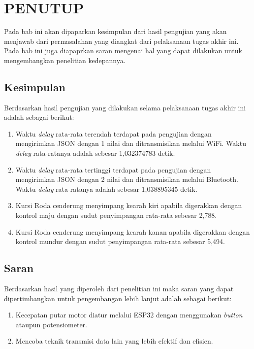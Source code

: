 \chapter{PENUTUP}
\label{chap:penutup}

Pada bab ini akan dipaparkan kesimpulan dari hasil pengujian yang akan menjawab dari permasalahan yang diangkat dari pelaksanaan tugas akhir ini. Pada bab ini juga diapaprkan saran mengenai hal yang dapat dilakukan untuk mengembangkan penelitian kedepannya.


\section{Kesimpulan}
\label{sec:kesimpulan}

Berdasarkan hasil pengujian yang dilakukan selama pelaksanaan tugas akhir ini adalah sebagai berikut:

\begin{enumerate}[nolistsep]

  \item Waktu \emph{delay} rata-rata terendah terdapat pada pengujian dengan mengirimkan JSON dengan 1 nilai dan ditransmisikan melalui WiFi. Waktu \emph{delay} rata-ratanya adalah sebesar 1,032374783 detik.

  \item Waktu \emph{delay} rata-rata tertinggi terdapat pada pengujian dengan mengirimkan JSON dengan 2 nilai dan ditransmisikan melalui Bluetooth. Waktu \emph{delay} rata-ratanya adalah sebesar 1,038895345 detik. 
  
  \item Kursi Roda cenderung menyimpang kearah kiri apabila digerakkan dengan kontrol maju dengan sudut penyimpangan rata-rata sebesar 2,788\textdegree.
  
  \item Kursi Roda cenderung menyimpang kearah kanan apabila digerakkan dengan kontrol mundur dengan sudut penyimpangan rata-rata sebesar 5,494\textdegree.

\end{enumerate}

\section{Saran}
\label{chap:saran}

Berdasarkan hasil yang diperoleh dari penelitian ini maka saran yang dapat dipertimbangkan untuk pengembangan lebih lanjut adalah sebagai berikut:

\begin{enumerate}[nolistsep]

  \item Kecepatan putar motor diatur melalui ESP32 dengan menggunakan \emph{button} ataupun potensiometer.

  \item Mencoba teknik transmisi data lain yang lebih efektif dan efisien.

\end{enumerate}
